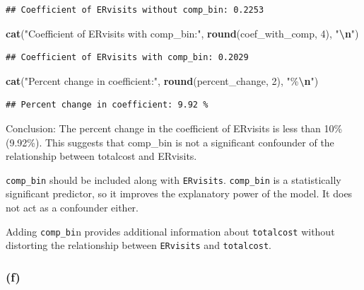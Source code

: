 \documentclass[
]{article}
\newenvironment{Shaded}{\begin{snugshade}}{\end{snugshade}}
\newcommand{\DecValTok}[1]{\textcolor[rgb]{0.00,0.00,0.81}{#1}}
\newcommand{\FunctionTok}[1]{\textcolor[rgb]{0.13,0.29,0.53}{\textbf{#1}}}
\newcommand{\NormalTok}[1]{#1}
\newcommand{\SpecialCharTok}[1]{\textcolor[rgb]{0.81,0.36,0.00}{\textbf{#1}}}
\newcommand{\StringTok}[1]{\textcolor[rgb]{0.31,0.60,0.02}{#1}}
\begin{document}
\begin{verbatim}
## Coefficient of ERvisits without comp_bin: 0.2253
\end{verbatim}

\begin{Shaded}
\begin{Highlighting}[]
\FunctionTok{cat}\NormalTok{(}\StringTok{"Coefficient of ERvisits with comp\_bin:"}\NormalTok{, }\FunctionTok{round}\NormalTok{(coef\_with\_comp, }\DecValTok{4}\NormalTok{), }\StringTok{"}\SpecialCharTok{\textbackslash{}n}\StringTok{"}\NormalTok{)}
\end{Highlighting}
\end{Shaded}

\begin{verbatim}
## Coefficient of ERvisits with comp_bin: 0.2029
\end{verbatim}

\begin{Shaded}
\begin{Highlighting}[]
\FunctionTok{cat}\NormalTok{(}\StringTok{"Percent change in coefficient:"}\NormalTok{, }\FunctionTok{round}\NormalTok{(percent\_change, }\DecValTok{2}\NormalTok{), }\StringTok{"\%}\SpecialCharTok{\textbackslash{}n}\StringTok{"}\NormalTok{)}
\end{Highlighting}
\end{Shaded}

\begin{verbatim}
## Percent change in coefficient: 9.92 %
\end{verbatim}

Conclusion: The percent change in the coefficient of ERvisits is less
than 10\% (9.92\%). This suggests that comp\_bin is not a significant
confounder of the relationship between totalcost and ERvisits.

\texttt{comp\_bin} should be included along with \texttt{ERvisits}.
\texttt{comp\_bin} is a statistically significant predictor, so it
improves the explanatory power of the model. It does not act as a
confounder either.

Adding \texttt{comp\_bi}n provides additional information about
\texttt{totalcost} without distorting the relationship between
\texttt{ERvisits} and \texttt{totalcost}.

\subsubsection{(f)}\label{f}
\end{document}
